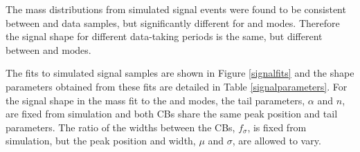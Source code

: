 The \Bm mass distributions from simulated signal events were found to be consistent between \runone and \runtwo data samples, but significantly different for \kpi and \kpipipi modes. Therefore the signal shape for different data-taking periods is the same, but different between \kpi and \kpipipi modes. 

%

The fits to simulated signal samples are shown in Figure \ref{signalfits} and the shape parameters obtained from these fits are detailed in Table \ref{signalparameters}. For the signal shape in the mass fit to the \kpi and \kpipipi modes, the tail parameters, $\alpha$ and $n$, are fixed from simulation and both CBs share the same peak position and tail parameters. The ratio of the widths between the CBs, $f_{\sigma}$, is fixed from simulation, but the peak position and width, $\mu$ and $\sigma$, are allowed to vary.

